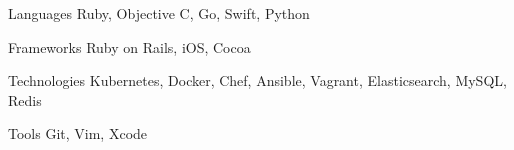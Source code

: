 

\begin{cvskills}

  \cvskill
    {Languages} %
    {Ruby, Objective C, Go, Swift, Python} %
    
  \cvskill
    {Frameworks} %
    {Ruby on Rails, iOS, Cocoa} %
    
  \cvskill
    {Technologies} %
    {Kubernetes, Docker, Chef, Ansible, Vagrant, Elasticsearch, MySQL, Redis} %

  \cvskill
    {Tools} %
    {Git, Vim, Xcode} %

\end{cvskills}
